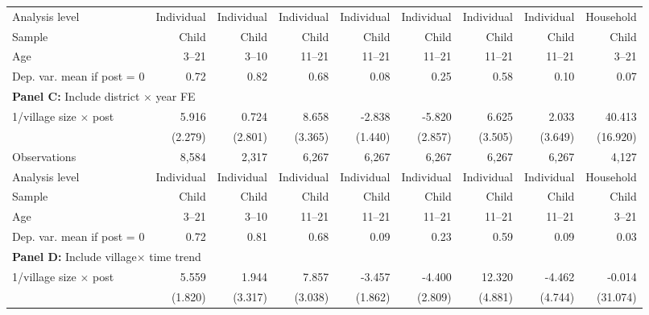 \begin{center}
\begin{threeparttable}
\begin{tabular}{l*{8}{r}}
Analysis level      &  Individual&  Individual&  Individual&  Individual&  Individual&  Individual&  Individual&   Household\\
Sample              &       Child&       Child&       Child&       Child&       Child&       Child&       Child&       Child\\
Age                 &       3--21&       3--10&      11--21&      11--21&      11--21&      11--21&      11--21&       3--21\\
Dep. var. mean if post = 0&        0.72&        0.82&        0.68&        0.08&        0.25&        0.58&        0.10&        0.07\\
\hline \multicolumn{9}{l}{\textbf{Panel C:} Include district $\times$ year FE} \\
1/village size $\times$ post&       5.916&       0.724&       8.658&      -2.838&      -5.820&       6.625&       2.033&      40.413\\
                    &     (2.279)&     (2.801)&     (3.365)&     (1.440)&     (2.857)&     (3.505)&     (3.649)&    (16.920)\\

Observations        &       8,584&       2,317&       6,267&       6,267&       6,267&       6,267&       6,267&       4,127\\
Analysis level      &  Individual&  Individual&  Individual&  Individual&  Individual&  Individual&  Individual&   Household\\
Sample              &       Child&       Child&       Child&       Child&       Child&       Child&       Child&       Child\\
Age                 &       3--21&       3--10&      11--21&      11--21&      11--21&      11--21&      11--21&       3--21\\
Dep. var. mean if post = 0&        0.72&        0.81&        0.68&        0.09&        0.23&        0.59&        0.09&        0.03\\
\hline \multicolumn{9}{l}{\textbf{Panel D:} Include village$\times$ time trend} \\
1/village size $\times$ post&       5.559&       1.944&       7.857&      -3.457&      -4.400&      12.320&      -4.462&      -0.014\\
                    &     (1.820)&     (3.317)&     (3.038)&     (1.862)&     (2.809)&     (4.881)&     (4.744)&    (31.074)\\


\end{tabular}
\end{threeparttable}
\end{center}
